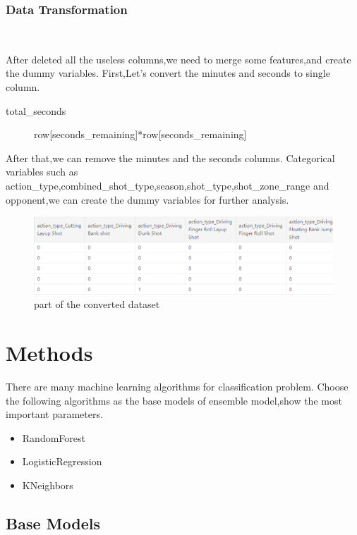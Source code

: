 \subsubsection{Data Transformation}
\

After deleted all the useless columns,we need to merge some features,and create the dummy variables.
First,Let's convert the minutes and seconds to single column.
\begin{description}
	\item[total\_seconds] row[seconds\_remaining]*row[seconds\_remaining] 
\end{description}
After that,we can remove the minutes and the seconds columns.
Categorical variables such as action_type,combined_shot_type,season,shot_type,shot_zone_range 
and opponent,we can create the dummy variables for further analysis.
\begin{figure}[htbp]
	\centering
	\includegraphics[scale=0.3]{u.eps
	}        %
	\caption{part of the converted dataset}
	\label{fig8}
\end{figure}

\section{Methods}

There are many machine learning algorithms 
for classification problem. 
Choose the following algorithms
as the base models of ensemble model,show the most important parameters.

\begin{itemize}
	\item RandomForest 
	\item LogisticRegression

	\item KNeighbors 

\end{itemize}
\subsection{Base Models}
\

